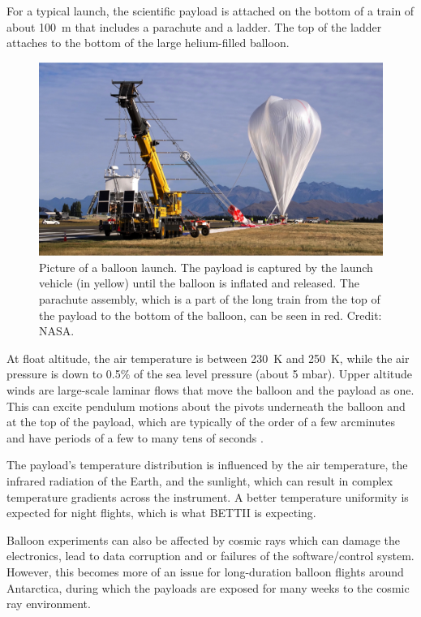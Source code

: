 For a typical launch, the scientific payload is attached on the bottom of a train of about \SI{100}{\meter} that includes a parachute and a ladder. The top of the ladder attaches to the bottom of the large helium-filled balloon. 
\begin{figure}[!ht]
	\centering
	\includegraphics[width=\textwidth]{Figures/balloonLaunch.png} 
	\caption[Balloon launch]{Picture of a balloon launch. The payload is captured by the launch vehicle (in yellow) until the balloon is inflated and released. The parachute assembly, which is a part of the long train from the top of the payload to the bottom of the balloon, can be seen in red. Credit: NASA.}
	\label{fig:BalloonLaunch}
    \end{figure}





At float altitude, the air temperature is between \SI{230}{\kelvin} and \SI{250}{\kelvin}, while the air pressure is down to 0.5\% of the sea level pressure (about 5 mbar). Upper altitude winds are large-scale laminar flows that move the balloon and the payload as one. This can excite pendulum motions about the pivots underneath the balloon and at the top of the payload, which are typically of the order of a few arcminutes and have periods of a few to many tens of seconds \citep{Fixsen:1996kha}.

The payload's temperature distribution is influenced by the air temperature, the infrared radiation of the Earth, and the sunlight, which can result in complex temperature gradients across the instrument. A better temperature uniformity is expected for night flights, which is what BETTII is expecting.

Balloon experiments can also be affected by cosmic rays which can damage the electronics, lead to data corruption and or failures of the software/control system. However, this becomes more of an issue for long-duration balloon flights around Antarctica, during which the payloads are exposed for many weeks to the cosmic ray environment.

